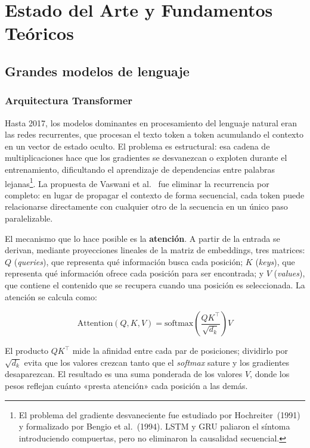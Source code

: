 \chapter{Estado del Arte y Fundamentos Teóricos}
\label{ch:estado-arte}

\section{Grandes modelos de lenguaje}

\subsection{Arquitectura Transformer}

Hasta 2017, los modelos dominantes en procesamiento del lenguaje natural eran las redes
recurrentes, que procesan el texto token a token acumulando el contexto en un vector de estado
oculto. El problema es estructural: esa cadena de multiplicaciones hace que los gradientes se
desvanezcan o exploten durante el entrenamiento, dificultando el aprendizaje de dependencias entre
palabras lejanas\footnote{%
  El problema del gradiente desvaneciente fue estudiado por Hochreiter~(1991) y formalizado por
  Bengio et al.~(1994). LSTM y GRU paliaron el síntoma introduciendo compuertas, pero no
  eliminaron la causalidad secuencial.%
}. La propuesta de Vaswani et al.~\cite{vaswani2017attention} fue eliminar la recurrencia por
completo: en lugar de propagar el contexto de forma secuencial, cada token puede relacionarse
directamente con cualquier otro de la secuencia en un único paso paralelizable.

El mecanismo que lo hace posible es la \textbf{atención}. A partir de la entrada se derivan,
mediante proyecciones lineales de la matriz de embeddings, tres matrices: $Q$ (\textit{queries}),
que representa qué información busca cada posición; $K$ (\textit{keys}), que representa qué
información ofrece cada posición para ser encontrada; y $V$ (\textit{values}), que contiene el
contenido que se recupera cuando una posición es seleccionada. La atención se calcula como:

\begin{equation}
  \text{Attention}(Q, K, V) = \text{softmax}\!\left(\frac{QK^\top}{\sqrt{d_k}}\right)V
  \label{eq:attention}
\end{equation}

El producto $QK^\top$ mide la afinidad entre cada par de posiciones; dividirlo por $\sqrt{d_k}$
evita que los valores crezcan tanto que el \textit{softmax} sature y los gradientes desaparezcan.
El resultado es una suma ponderada de los valores $V$, donde los pesos reflejan cuánto «presta
atención» cada posición a las demás.

